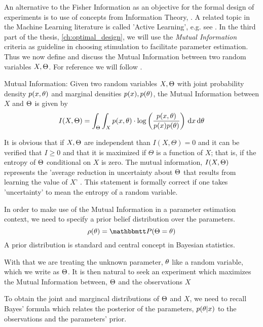 An alternative to the Fisher Information as an objective for the formal design
of experiments is to use of concepts from Information Theory, \cite{MacKay2003}.
A related topic in the Machine Learning literature is called 'Active Learning',
e.g. see \cite{Cohn1996,Settles2010,Seeger2008}. In the third part of the
thesis, \cref{ch:optimal_design}, we will use the {\sl Mutual Information}
criteria as guideline in choosing stimulation to facilitate parameter
estimation. Thus we now define and discuss the Mutual Information between two
random variables $X, {\Theta}$. For reference we will follow \cite{MacKay2003}.

\begin{defn}Mutual Information:
Given two random variables $X,{\Theta}$ with joint probability density
$p(x,{ \theta})$ and marginal densities $p(x), p({ \theta})$, the Mutual Information between
$X$ and ${\Theta}$ is given by
\begin{equation}
I(X,\Theta) = \int_\Theta \int_X p(x,{ \theta}) \cdot \log \left(
\frac{p(x,{ \theta})}{p(x)p({ \theta})}\right) \, \mathrm{d} x \, \mathrm{d} { \theta}
\label{eq:mutual_info_defn}
\end{equation}
\end{defn}

It is obvious that if $X,{\Theta}$ are independent than $I(X,\Theta) = 0$ and it can
be verified that $I\geq0$ and that it is maximized if $\Theta$ is a function of
$X$; that is, if the entropy of ${\Theta}$ conditional on $X$ is zero. 
The mutual information, $I(X,{\Theta})$ represents the 'average
reduction in uncertainty about ${\Theta}$ that results from learning the value of
$X$' \cite{MacKay2003}. This statement is formally correct if one takes
 'uncertainty' to mean the entropy of a random
 variable.
 
In order to make use of the Mutual Information in a parameter estimation
context, we need to specify a prior belief distribution over the  parameters.  
$$
\rho(\th) = \Prob(\Theta = \th)
$$
A prior distribution is standard and central concept in Bayesian statistics.
 
With that we are treating the unknown parameter, ${ \theta}$ like a random variable,
which we write as ${\Theta}$. It is then natural to seek an experiment which
maximizes the Mutual Information between, ${\Theta}$ and the observations $X$

To obtain the joint and margincal distributions of ${\Theta}$ and $X$, we
need to recall Bayes' formula which relates the posterior of the parameters,
$p({ \theta}|x)$ to the observations and the parameters' prior. 

